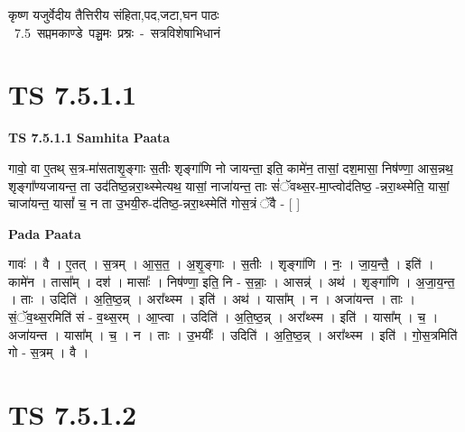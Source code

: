 \documentclass[17pt]{extarticle}
\begin{document}
\begin{titlepage}
    \begin{center}
 
\begin{sanskrit}
    { \Huge
    कृष्ण यजुर्वेदीय तैत्तिरीय संहिता,पद,जटा,घन पाठः 
    }
    \\
    \vspace{2.5cm}
    \mbox{ \Huge
    7.5      सप्तमकाण्डे पञ्चमः प्रश्नः - सत्रविशेषाभिधानं   }
\end{sanskrit}
\end{center}

\end{titlepage}
\tableofcontents
\pagebreak

\section*{ TS 7.5.1.1 }

\textbf{TS 7.5.1.1 } \newline
\textbf{Samhita Paata} \newline

गावो॒ वा ए॒तथ् स॒त्र-मा॑सताशृ॒ङ्गाः स॒तीः शृङ्गा॑णि नो जायन्ता॒ इति॒ कामे॑न॒ तासां॒ दश॒मासा॒ निष॑ण्णा॒ आस॒न्नथ॒ शृङ्गा᳚ण्यजायन्त॒ ता उद॑तिष्ठ॒न्नरा॒थ्स्मेत्यथ॒ यासां॒ नाजा॑यन्त॒ ताः सं॑ॅवथ्स॒र-मा॒प्त्वोद॑तिष्ठ॒ -न्नरा॒थ्स्मेति॒ यासां॒ चाजा॑यन्त॒ यासां᳚ च॒ न ता उ॒भयी॒रु-द॑तिष्ठ॒-न्नरा॒थ्स्मेति॑ गोस॒त्रं ॅवै - [  ] \newline

\textbf{Pada Paata} \newline

गावः॑ । वै । ए॒तत् । स॒त्रम् । आ॒स॒त॒ । अ॒शृ॒ङ्गाः । स॒तीः । शृङ्गा॑णि । नः॒ । जा॒य॒न्तै॒ । इति॑ । कामे॑न । तासा᳚म् । दश॑ । मासाः᳚ । निष॑ण्णा॒ इति॒ नि - स॒न्नाः॒ । आसन्न्॑ । अथ॑ । शृङ्गा॑णि । अ॒जा॒य॒न्त॒ । ताः । उदिति॑ । अ॒ति॒ष्ठ॒न्न् । अरा᳚थ्स्म । इति॑ । अथ॑ । यासा᳚म् । न । अजा॑यन्त । ताः । सं॒ॅव॒थ्स॒रमिति॑ सं -  व॒थ्स॒रम् । आ॒प्त्वा । उदिति॑ । अ॒ति॒ष्ठ॒न्न् । अरा᳚थ्स्म । इति॑ । यासा᳚म् । च॒ । अजा॑यन्त । यासा᳚म् । च॒ । न । ताः । उ॒भयीः᳚ । उदिति॑ । अ॒ति॒ष्ठ॒न्न् । अरा᳚थ्स्म । इति॑ । गो॒स॒त्रमिति॑ गो - स॒त्रम् । वै ।  \newline




\section*{ TS 7.5.1.2 }
\end{document}
